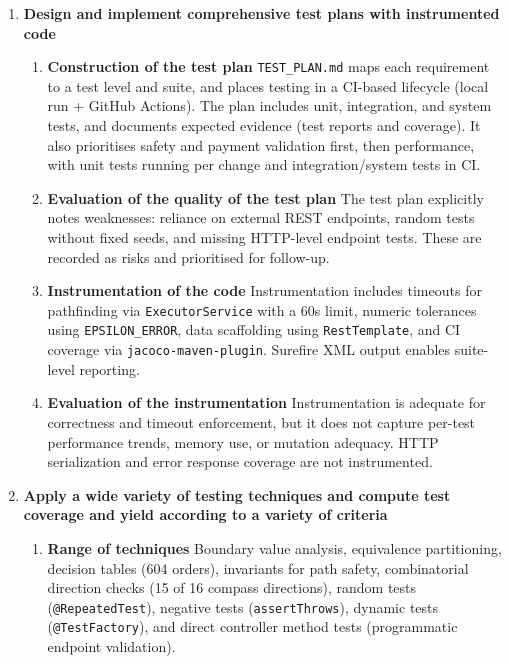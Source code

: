 \documentclass{article}
\begin{document}
\begin{enumerate}
\item \textbf{Design and implement comprehensive test plans with instrumented code} \marginpar{[default 20\%]}
\begin{enumerate}
\item \textbf{Construction of the test plan}
\texttt{TEST\_PLAN.md} maps each requirement to a test level and suite, and places testing in a CI-based lifecycle (local run + GitHub Actions). The plan includes unit, integration, and system tests, and documents expected evidence (test reports and coverage). It also prioritises safety and payment validation first, then performance, with unit tests running per change and integration/system tests in CI.

\item \textbf{Evaluation of the quality of the test plan}
The test plan explicitly notes weaknesses: reliance on external REST endpoints, random tests without fixed seeds, and missing HTTP-level endpoint tests. These are recorded as risks and prioritised for follow-up.

\item \textbf{Instrumentation of the code}
Instrumentation includes timeouts for pathfinding via \texttt{ExecutorService} with a 60s limit, numeric tolerances using \texttt{EPSILON\_ERROR}, data scaffolding using \texttt{RestTemplate}, and CI coverage via \texttt{jacoco-maven-plugin}. Surefire XML output enables suite-level reporting.

\item \textbf{Evaluation of the instrumentation}
Instrumentation is adequate for correctness and timeout enforcement, but it does not capture per-test performance trends, memory use, or mutation adequacy. HTTP serialization and error response coverage are not instrumented.
\end{enumerate}

\item \textbf{Apply a wide variety of testing techniques and compute test coverage and yield according to a variety of criteria} \marginpar{[default 20\%]}
\begin{enumerate}
\item\textbf{Range of techniques}
Boundary value analysis, equivalence partitioning, decision tables (604 orders), invariants for path safety, combinatorial direction checks (15 of 16 compass directions), random tests (\texttt{@RepeatedTest}), negative tests (\texttt{assertThrows}), dynamic tests (\texttt{@TestFactory}), and direct controller method tests (programmatic endpoint validation).


\end{enumerate}
\end{enumerate}
\end{document}
